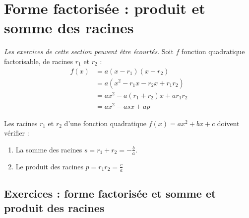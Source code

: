 \documentclass[main.tex]{subfiles}
\begin{document}
\section{Forme factorisée : produit et somme des racines}
\emph{Les exercices de cette section peuvent être écourtés}.
Soit $f$ fonction quadratique factorisable, de racines $r_1$ et $r_2$ :
\begin{align*}
	f(x)& = a(x-r_1)(x-r_2) \\
	& = a (x^2- r_1x -r_2x + r_1r_2)\\
	& = ax^2 - a(r_1+r_2) x + ar_1r_2 \\
	& = ax^2- a sx + ap
\end{align*}
\begin{theorem} Les racines $r_1$ et $r_2$ d'une fonction quadratique $f(x)=ax^2+bx+c$ doivent vérifier :
	\begin{enumerate}[leftmargin=*,label=\textbullet]
		\item La somme des racines $s = r_1+r_2= -\frac{b}{a}$.
		\item Le produit des racines $p=r_1r_2= \frac{c}{a}$
	\end{enumerate} 
\end{theorem}
\newpage 
{}  
\pagestyle{scrheadings} %
\onehalfspacing
\subsection{Exercices : forme factorisée et somme et produit des racines}
\end{document}
